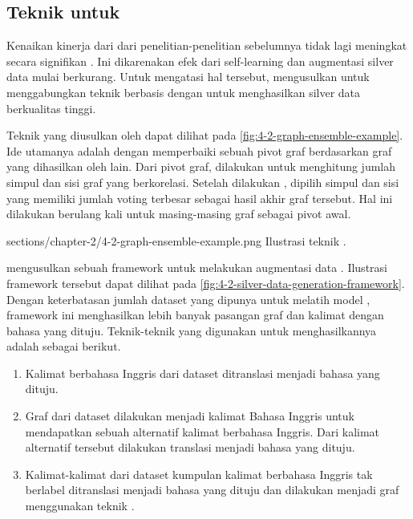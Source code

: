 \subsection{Teknik  untuk \amrparsing{}}

Kenaikan kinerja dari \amrparsing{} dari penelitian-penelitian sebelumnya tidak lagi meningkat secara signifikan .
Ini dikarenakan efek dari self-learning dan augmentasi silver data mulai berkurang.
Untuk mengatasi hal tersebut, \textcite{lee2022} mengusulkan untuk menggabungkan teknik  berbasis \SMATCH{}  dengan  untuk menghasilkan silver data berkualitas tinggi.

Teknik  yang diusulkan oleh \textcite{hoang2021} dapat dilihat pada \cref{fig:4-2-graph-ensemble-example}.
Ide utamanya adalah dengan memperbaiki sebuah pivot graf berdasarkan graf yang dihasilkan oleh  lain.
Dari pivot graf, dilakukan  untuk menghitung jumlah simpul dan sisi graf yang berkorelasi.
Setelah dilakukan , dipilih simpul dan sisi yang memiliki jumlah voting terbesar sebagai hasil akhir graf tersebut.
Hal ini dilakukan berulang kali untuk masing-masing graf sebagai pivot awal.

  {sections/chapter-2/4-2-graph-ensemble-example.png}
  {Ilustrasi teknik  .}

\textcite{lee2022} mengusulkan sebuah framework untuk melakukan augmentasi data \AMR{}.
Ilustrasi framework tersebut dapat dilihat pada \cref{fig:4-2-silver-data-generation-framework}.
Dengan keterbatasan jumlah dataset yang dipunya untuk melatih model \crosslingual{}, framework ini menghasilkan lebih banyak pasangan graf \AMR{} dan kalimat dengan bahasa yang dituju.
Teknik-teknik yang digunakan untuk menghasilkannya adalah sebagai berikut.
\begin{enumerate}
  \item Kalimat berbahasa Inggris dari dataset \AMR{} ditranslasi menjadi bahasa yang dituju.

  \item Graf \AMR{} dari dataset \AMR{} dilakukan  menjadi kalimat Bahasa Inggris untuk mendapatkan sebuah alternatif kalimat berbahasa Inggris.
  Dari kalimat alternatif tersebut dilakukan translasi menjadi bahasa yang dituju.

  \item Kalimat-kalimat dari dataset kumpulan kalimat berbahasa Inggris tak berlabel ditranslasi menjadi bahasa yang dituju dan dilakukan  menjadi graf \AMR{} menggunakan teknik .
\end{enumerate}

